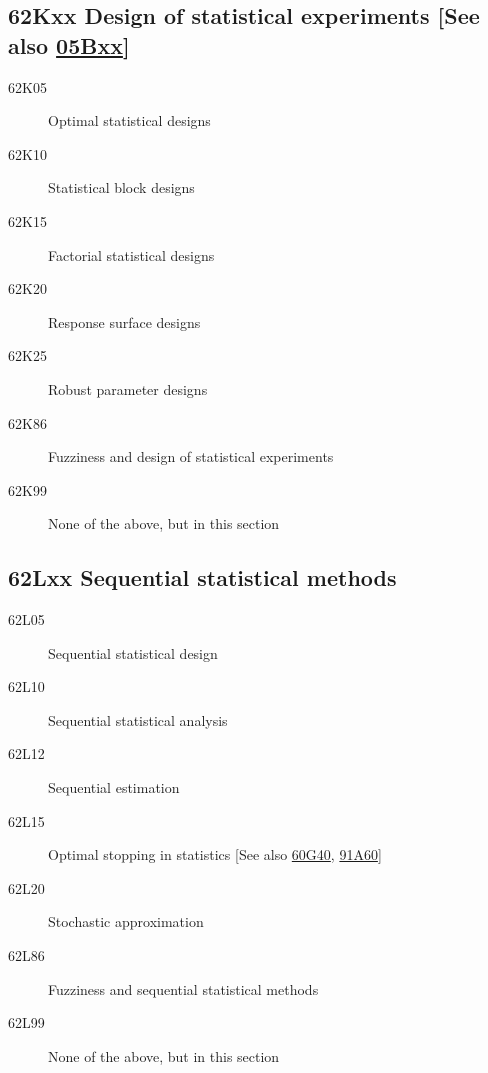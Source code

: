\documentclass[letterpaper]{article}
\begin{document}
\subsection*{62Kxx  Design of statistical experiments [See also \hyperref[05Bxx]{05Bxx}] }\label{62Kxx}
\begin{description}  
\item [62K05]\label{62K05} Optimal statistical designs
\item [62K10]\label{62K10} Statistical block designs
\item [62K15]\label{62K15} Factorial statistical designs
\item [62K20]\label{62K20} Response surface designs
\item [62K25]\label{62K25} Robust parameter designs
\item [62K86]\label{62K86} Fuzziness and design of statistical experiments
\item [62K99]\label{62K99} None of the above, but in this section
\end{description}
\subsection*{62Lxx  Sequential statistical methods }\label{62Lxx}
\begin{description}  
\item [62L05]\label{62L05} Sequential statistical design
\item [62L10]\label{62L10} Sequential statistical analysis
\item [62L12]\label{62L12} Sequential estimation
\item [62L15]\label{62L15} Optimal stopping in statistics [See also \hyperref[60G40]{60G40}, \hyperref[91A60]{91A60}]
\item [62L20]\label{62L20} Stochastic approximation
\item [62L86]\label{62L86} Fuzziness and sequential statistical methods
\item [62L99]\label{62L99} None of the above, but in this section
\end{description}
\end{document}
